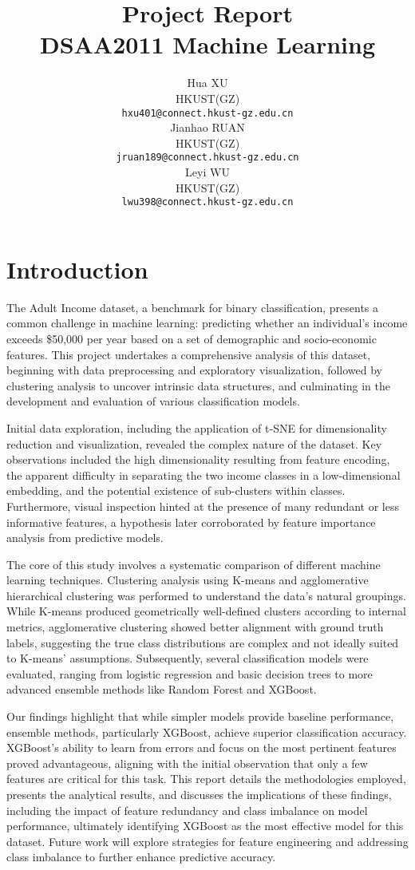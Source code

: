 \documentclass{article}
\title{Project Report \large \\ DSAA2011 Machine Learning}
\author{%
   Hua XU \\
   HKUST(GZ) \\
   \texttt{hxu401@connect.hkust-gz.edu.cn} \\
   \And
   Jianhao RUAN \\
   HKUST(GZ) \\
   \texttt{jruan189@connect.hkust-gz.edu.cn} \\
   \And
   Leyi WU \\
   HKUST(GZ) \\
   \texttt{lwu398@connect.hkust-gz.edu.cn} \\
}
\begin{document}
\maketitle

\section{Introduction}

The Adult Income dataset, a benchmark for binary classification, presents a common challenge in machine learning: predicting whether an individual's income exceeds \$50,000 per year based on a set of demographic and socio-economic features. This project undertakes a comprehensive analysis of this dataset, beginning with data preprocessing and exploratory visualization, followed by clustering analysis to uncover intrinsic data structures, and culminating in the development and evaluation of various classification models.

Initial data exploration, including the application of t-SNE for dimensionality reduction and visualization, revealed the complex nature of the dataset. Key observations included the high dimensionality resulting from feature encoding, the apparent difficulty in separating the two income classes in a low-dimensional embedding, and the potential existence of sub-clusters within classes. Furthermore, visual inspection hinted at the presence of many redundant or less informative features, a hypothesis later corroborated by feature importance analysis from predictive models.

The core of this study involves a systematic comparison of different machine learning techniques. Clustering analysis using K-means and agglomerative hierarchical clustering was performed to understand the data's natural groupings. While K-means produced geometrically well-defined clusters according to internal metrics, agglomerative clustering showed better alignment with ground truth labels, suggesting the true class distributions are complex and not ideally suited to K-means' assumptions. Subsequently, several classification models were evaluated, ranging from logistic regression and basic decision trees to more advanced ensemble methods like Random Forest and XGBoost.

Our findings highlight that while simpler models provide baseline performance, ensemble methods, particularly XGBoost, achieve superior classification accuracy. XGBoost's ability to learn from errors and focus on the most pertinent features proved advantageous, aligning with the initial observation that only a few features are critical for this task. This report details the methodologies employed, presents the analytical results, and discusses the implications of these findings, including the impact of feature redundancy and class imbalance on model performance, ultimately identifying XGBoost as the most effective model for this dataset. Future work will explore strategies for feature engineering and addressing class imbalance to further enhance predictive accuracy.
\end{document}
